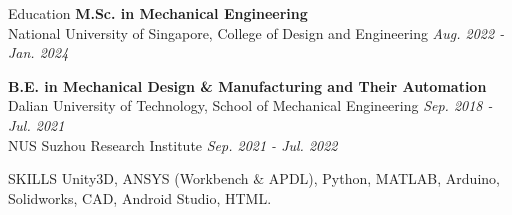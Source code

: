 \documentclass{resume} %
\begin{document}
\begin{rSection}{Education}
{\bf M.Sc. in Mechanical Engineering} \\
National University of Singapore, College of Design and Engineering \hfill {\em Aug. 2022 - Jan. 2024}\\

\vspace{-1em}

{\bf B.E. in Mechanical Design \& Manufacturing and Their Automation} \\
Dalian University of Technology, School of Mechanical Engineering \hfill {\em Sep. 2018 - Jul. 2021}\\
NUS Suzhou Research Institute
\hfill {\em Sep. 2021 - Jul. 2022}\\
\end{rSection}

\vspace{-1em}

\begin{rSection}{SKILLS}
Unity3D, ANSYS (Workbench $\&$ APDL), Python, MATLAB, Arduino, Solidworks, CAD, Android Studio, HTML.  \\
\end{rSection}

\vspace{-1em}


\end{document}
